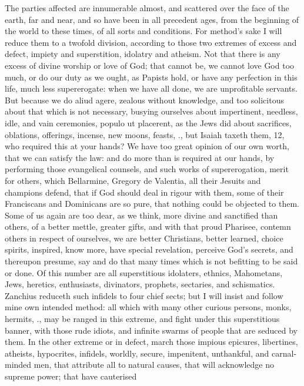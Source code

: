 {The parties affected are innumerable almost, and scattered over the
face of the earth, far and near, and so have been in all precedent
ages, from the beginning of the world to these times, of all sorts and
conditions. For method's sake I will reduce them to a twofold division,
according to those two extremes of excess and defect, impiety and
superstition, idolatry and atheism. Not that there is any excess of
divine worship or love of God; that cannot be, we cannot love God too
much, or do our duty as we ought, as Papists hold, or have any
perfection in this life, much less supererogate: when we have all done,
we are unprofitable servants. But because we do aliud agere, zealous
without knowledge, and too solicitous about that which is not
necessary, busying ourselves about impertinent, needless, idle, and
vain ceremonies, populo ut placerent, as the Jews did about sacrifices,
oblations, offerings, incense, new moons, feasts, \etc{}., but Isaiah
taxeth them,  12, who required this at your hands? We have too great
opinion of our own worth, that we can satisfy the law: and do more than
is required at our hands, by performing those evangelical counsels, and
such works of supererogation, merit for others, which Bellarmine,
Gregory de Valentia, all their Jesuits and champions defend, that if
God should deal in rigour with them, some of their Franciscans and
Dominicans are so pure, that nothing could be objected to them. Some of
us again are too dear, as we think, more divine and sanctified than
others, of a better mettle, greater gifts, and with that proud
Pharisee, contemn others in respect of ourselves, we are better
Christians, better learned, choice spirits, inspired, know more, have
special revelation, perceive God's secrets, and thereupon presume, say
and do that many times which is not befitting to be said or done. Of
this number are all superstitious idolaters, ethnics, Mahometans, Jews,
heretics, enthusiasts, divinators, prophets, sectaries, and
schismatics. Zanchius reduceth such infidels to four chief sects; but I
will insist and follow mine own intended method: all which with many
other curious persons, monks, hermits, \etc{}., may be ranged in this
extreme, and fight under this superstitious banner, with those rude
idiots, and infinite swarms of people that are seduced by them. In the
other extreme or in defect, march those impious epicures, libertines,
atheists, hypocrites, infidels, worldly, secure, impenitent,
unthankful, and carnal-minded men, that attribute all to natural
causes, that will acknowledge no supreme power; that have cauterised
}
